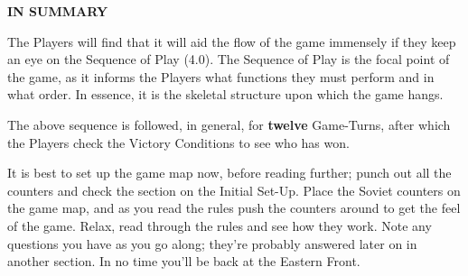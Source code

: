 \textbf{IN SUMMARY}

The Players will find that it will aid the flow of the game immensely if they keep an eye on the Sequence of Play (4.0). The Sequence of Play is the focal point of the game, as it informs the Players what functions they must perform and in what order. In essence, it is the skeletal structure upon which the game hangs.

The above sequence is followed, in general, for \textbf{twelve} Game-Turns, after which the Players check the Victory Conditions to see who has won.

It is best to set up the game map now, before reading further; punch out all the counters and check the section on the Initial Set-Up. Place the Soviet counters on the game map, and as you read the rules push the counters around to get the feel of the game. Relax, read through the rules and see how they work. Note any questions you have as you go along; they're probably answered later on in another section. In no time you'll be back at the Eastern Front.
